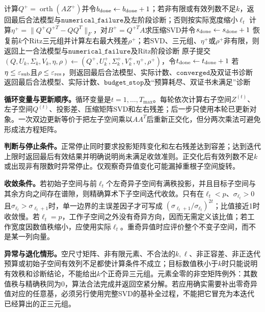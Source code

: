 \begin{AlgorithmContract}
\begin{algorithm}[!t]
{  计算$Q^+=\operatorname{orth}(AZ^+)$并令$b_{\rm done}\leftarrow b_{\rm done}+1$；若非有限或有效列数不足$k$，返回最后合法模型与$\mathtt{numerical\_failure}$及左阶段诊断；否则按实际宽度缩小$\ell_t$\;
  计算$\eta^+=\|Q^+Q^{+T}-QQ^T\|_F$，对$B^+=Q^{+T}A$求压缩SVD并令$s_{\rm done}\leftarrow s_{\rm done}+1$\;
  恢复前$k$个Ritz三元组并计算左右最大残差$\rho^+$；若SVD、三元组、$\eta^+$或$\rho^+$非有限，则返回上一合法模型与$\mathtt{numerical\_failure}$及Ritz阶段诊断\;
  原子提交$(Q,U_k,\Sigma_k,V_k,\eta,\rho)\leftarrow(Q^+,U_k^+,\Sigma_k^+,V_k^+,\eta^+,\rho^+)$，令$t_{\rm done}\leftarrow t_{\rm done}+1$\;
  若$\eta\le\varepsilon_{\rm sub}$且$\rho\le\varepsilon_{\rm res}$，则返回最后合法模型、实际计数、$\mathtt{converged}$及双证书诊断\;
}
返回最后合法模型、实际计数、$\mathtt{budget\_stop}$及“预算耗尽、双证书未满足”诊断\;
\end{algorithm}
\end{AlgorithmContract}

\label{struct:V4-C03-CH23}
\textbf{循环变量与更新顺序。}循环变量是$t=1,\ldots,T_{\max}$。每轮依次计算右子空间$Z^{(t)}$、左子空间$Q^{(t)}$、投影差、压缩矩阵SVD和左右残差；后一步只使用本轮已更新对象。一次双边更新等价于把左子空间乘以$AA^T$后重新正交化，但分两次乘法可避免形成法方程矩阵。

\label{struct:V4-C03-CH24}
\textbf{判断与停止条件。}正常停止同时要求投影矩阵变化和左右残差达到容差；达到迭代上限时返回最后有效结果并明确说明尚未满足收敛准则。正交化后有效列数不足$k$或出现非有限数时异常停止。仅观察奇异值变化可能漏掉重根子空间旋转。

\label{struct:V4-C03-CH25}
\textbf{收敛条件。}若初始子空间与前$\ell_t$个左奇异子空间有满秩投影，并且目标子空间与其余方向之间存在谱隙，则精确算术下子空间迭代收敛。只有在$\ell_t<p$、$\sigma_{\ell_t}>0$且$\sigma_{\ell_t}>\sigma_{\ell_t+1}$时，单一边界的主误差因子才可写成
$(\sigma_{\ell_t+1}/\sigma_{\ell_t})^{2t}$；比值接近1时收敛慢。若$\ell_t=p$，工作子空间之外没有奇异方向，因而无需定义该比值；若工作宽度因数值秩缩小，应使用实际$\ell_t$。重奇异值时应评价整个不变子空间，而不是某一列向量。

\textbf{异常与退化情形。}空尺寸矩阵、非有限元素、不合法的$k,\ell$、非正容差、非正迭代预算或初始子空间有效列不足都使计算条件不成立；目标数值秩小于$k$时只能说明有效秩和诊断结论，不能给出$k$个正奇异三元组。元素全零的非空矩阵例外：其数值秩与精确秩同为0，算法合法完成并返回空紧分解。若应用确实需要补出零奇异值对应的任意基，必须另行使用完整SVD的基补全过程，不能把它冒充为本迭代已经算出的正三元组。

